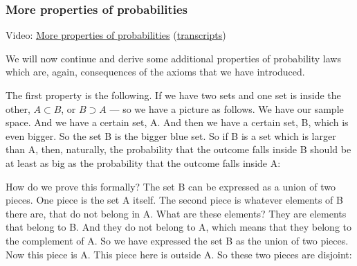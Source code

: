 \documentclass[pdftex, brazil, 12pt, twoside]{article}
\begin{document}
\subsubsection{More properties of probabilities}
\label{un1-lec1-more-properties}

Video: \href{https://www.youtube.com/watch?v=3gV4LWWhWwo}{More properties of
  probabilities}
(\href{Unit-1/01\_lecture\_1\_probability\_models\_and\_axioms/l01\_5\_transcripts.pdf}{transcripts})

We will now continue and derive some additional
properties of probability laws which are, again, consequences
of the axioms that we have introduced.

The first property is the following.
If we have two sets and one set is
inside the other, $A \subset B$, or $B \supset A$ ---
so we have a picture as follows.
We have our sample space.
And we have a certain set, A.
And then we have a certain set, B, which is even bigger.
So the set B is the bigger blue set.
So if B is a set which is larger than A, then,
naturally, the probability that the outcome falls inside
B should be at least as big as the probability that the
outcome falls inside A:

\begin{figure}[H]
  \begin{center}
  \end{center}
\end{figure}

How do we prove this formally?
The set B can be expressed as a union of two pieces.
One piece is the set A itself.
The second piece is whatever elements of B there are, that
do not belong in A. What are these elements?
They are elements that belong to B. And they do not belong
to A, which means that they belong to the complement of A.
So we have expressed the set B as the union of two pieces.
Now this piece is A. This piece here is outside A. So
these two pieces are disjoint:

\begin{figure}[H]
  \begin{center}
  \end{center}
\end{figure}
\end{document}
